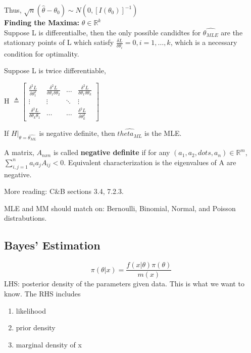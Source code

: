 \documentclass[11pt,fleqn]{book} %
\begin{document}
	Thus, $\sqrt{n}(\hat{\theta}-\theta_0)\sim N(0,[I(\theta_0)]^{-1})$\\

	\textbf{Finding the Maxima:} $\theta \in \mathbb{R}^k$\\
	Suppose L is differentialbe, then the only possible candidtes for $\hat{\theta_{MLE}}$ are the stationary points of L which satisfy $\frac{\delta L}{\delta \theta_i} = 0, i=1, \dots, k$, which is a necessary condition for optimality.

	Suppose L is twice differentiable,

	\begin{center}
	H $\triangleq \begin{bmatrix}
	    \frac{\delta^2 L}{\delta \theta_1^2} & \frac{\delta^2 L}{\delta \theta_1 \delta \theta_2} & \dots & \frac{\delta^2 L}{\delta \theta_1 \delta \theta_k} \\
	    \vdots & \vdots & \ddots & \vdots \\
	        \frac{\delta^2 L}{\delta \theta_k \theta_1} & \dots & \dots & \frac{\delta^2 L}{\delta \theta_k^2}

	\end{bmatrix}$	
	\end{center}

	If $H|_{\theta = \hat{\theta_{ML}}}$ is negative definite, then $\hat{theta_{ML}}$ is the MLE. 

	\begin{definition}
		A matrix, $A_{nxn}$ is called \textbf{negative definite} if for any $(a_1, a_2, dots, a_n) \in \mathbb{R}^m$, $\sum\limits^n_{i,j = 1} a_i a_j A_{ij} < 0$. Equivalent characterization is the eigenvalues of A are negative.
	\end{definition}

	\begin{remark}
	More reading: C\&B sections 3.4, 7.2.3.
	\end{remark}

	\begin{remark}
		MLE and MM should match on: Bernoulli, Binomial, Normal, and Poisson distrabutions. 
	\end{remark}

\subsection{Bayes' Estimation}

	\begin{theorem}
	$$\pi(\theta|x) = \frac{f(x|\theta)\pi(\theta)}{m(x)} $$
	LHS: posterior density of the parameters given data. This is what we want to know. The RHS includes
	\begin{enumerate}[label = \roman*)]
		\item likelihood
		\item prior density
		\item marginal density of x
	\end{enumerate}
		
	\end{theorem}
\end{document}
